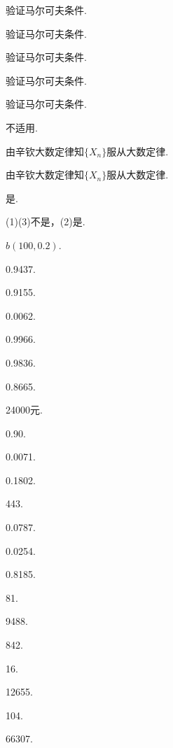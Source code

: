 \begin{answer}
  \item 验证马尔可夫条件.
  \item 验证马尔可夫条件.
  \item 验证马尔可夫条件.
  \item 验证马尔可夫条件.
  \item 验证马尔可夫条件.
  \item 不适用.
  \item 由辛钦大数定律知$\{X_n\}$服从大数定律.
  \item 由辛钦大数定律知$\{X_n\}$服从大数定律.
  \item 是.
\end{answer}

\begin{answer}
  \setcounter{enumi}{5}
  \item (1)(3)不是，(2)是.
\end{answer}

\begin{answer}
  \item \begin{enumerate*}
    \item $b(100,0.2)$.
    \item 0.9437.
  \end{enumerate*}
  \item 0.9155.
  \item 0.0062.
  \item 0.9966.
  \item 0.9836.
  \item 0.8665.
  \item \begin{enumerate*}
    \item 24000元.
    \item 0.90.
  \end{enumerate*}
  \item 0.0071.
  \item \begin{enumerate*}
    \item 0.1802.
    \item 443.
  \end{enumerate*}
  \item 0.0787.
  \item 0.0254.
  \item \begin{enumerate*}
    \item 0.8185.
    \item 81.
  \end{enumerate*}
  \item 9488.
  \item 842.
  \item 16.
  \item 12655.
  \item 104.
  \item 66307.
\end{answer}

